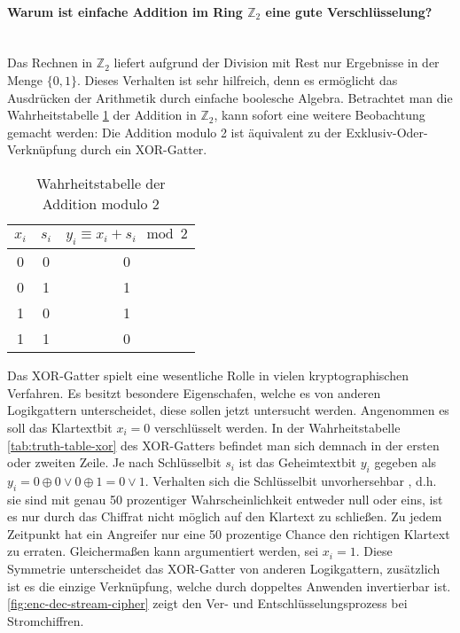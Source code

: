 \paragraph{Warum ist einfache Addition im Ring $\mathbb{Z}_2$ eine gute Verschlüsselung?}\mbox{}\\
Das Rechnen in $\mathbb{Z}_2$ liefert aufgrund der Division mit Rest nur Ergebnisse in
der Menge $\{0,1\}$. Dieses Verhalten ist sehr hilfreich, denn es ermöglicht das Ausdrücken der
Arithmetik durch einfache boolesche Algebra.
Betrachtet man die Wahrheitstabelle \ref{tab:truth-table-addition-mod-2}
der Addition in $\mathbb{Z}_2$, kann sofort eine weitere Beobachtung gemacht werden:
Die Addition modulo 2 ist äquivalent zu der Exklusiv-Oder-Verknüpfung durch ein XOR-Gatter.

\begin{table}[h]
  \centering
  \caption{Wahrheitstabelle der Addition modulo 2}
  \begin{tabular}{cc|c}
    $x_i$ & $s_i$ & $y_i \equiv x_i + s_i \mod{2}$ \\ \hline
    0     & 0     & 0                              \\
    0     & 1     & 1                              \\
    1     & 0     & 1                              \\
    1     & 1     & 0                              \\
  \end{tabular}
  \label{tab:truth-table-addition-mod-2}
\end{table}

\noindent
Das XOR-Gatter spielt eine wesentliche Rolle in vielen kryptographischen Verfahren.
Es besitzt besondere Eigenschafen, welche es von anderen Logikgattern
unterscheidet, diese sollen jetzt untersucht werden.
Angenommen es soll das Klartextbit $x_i = 0$ verschlüsselt werden. In der Wahrheitstabelle
\ref{tab:truth-table-xor} des XOR-Gatters befindet
man sich demnach in der ersten oder zweiten Zeile.
Je nach Schlüsselbit $s_i$ ist das Geheimtextbit $y_i$ gegeben als
$y_i = 0 \oplus 0 \vee 0 \oplus 1 = 0 \vee 1$.
Verhalten sich die Schlüsselbit unvorhersehbar , d.h. sie sind mit genau 50 prozentiger
Wahrscheinlichkeit entweder null oder eins, ist es nur durch das Chiffrat nicht möglich auf
den Klartext zu schließen. Zu jedem Zeitpunkt hat ein Angreifer nur eine
50 prozentige Chance den richtigen Klartext zu erraten.
Gleichermaßen kann argumentiert werden, sei $x_i = 1$.
Diese Symmetrie unterscheidet das XOR-Gatter von anderen Logikgattern, zusätzlich ist es die einzige
Verknüpfung, welche durch doppeltes Anwenden invertierbar ist.
\autoref{fig:enc-dec-stream-cipher} zeigt den Ver- und Entschlüsselungsprozess
bei Stromchiffren.

